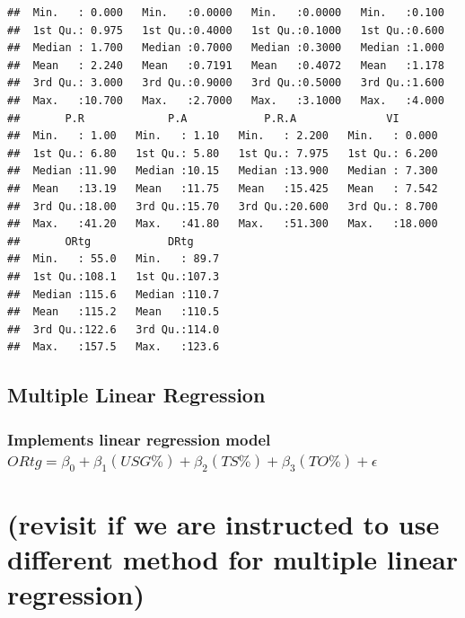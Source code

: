 \documentclass[
]{article}
\begin{document}
\begin{verbatim}
##  Min.   : 0.000   Min.   :0.0000   Min.   :0.0000   Min.   :0.100  
##  1st Qu.: 0.975   1st Qu.:0.4000   1st Qu.:0.1000   1st Qu.:0.600  
##  Median : 1.700   Median :0.7000   Median :0.3000   Median :1.000  
##  Mean   : 2.240   Mean   :0.7191   Mean   :0.4072   Mean   :1.178  
##  3rd Qu.: 3.000   3rd Qu.:0.9000   3rd Qu.:0.5000   3rd Qu.:1.600  
##  Max.   :10.700   Max.   :2.7000   Max.   :3.1000   Max.   :4.000  
##       P.R             P.A            P.R.A              VI        
##  Min.   : 1.00   Min.   : 1.10   Min.   : 2.200   Min.   : 0.000  
##  1st Qu.: 6.80   1st Qu.: 5.80   1st Qu.: 7.975   1st Qu.: 6.200  
##  Median :11.90   Median :10.15   Median :13.900   Median : 7.300  
##  Mean   :13.19   Mean   :11.75   Mean   :15.425   Mean   : 7.542  
##  3rd Qu.:18.00   3rd Qu.:15.70   3rd Qu.:20.600   3rd Qu.: 8.700  
##  Max.   :41.20   Max.   :41.80   Max.   :51.300   Max.   :18.000  
##       ORtg            DRtg      
##  Min.   : 55.0   Min.   : 89.7  
##  1st Qu.:108.1   1st Qu.:107.3  
##  Median :115.6   Median :110.7  
##  Mean   :115.2   Mean   :110.5  
##  3rd Qu.:122.6   3rd Qu.:114.0  
##  Max.   :157.5   Max.   :123.6
\end{verbatim}

\subsection{Multiple Linear
Regression}\label{multiple-linear-regression}

\subsubsection{\texorpdfstring{Implements linear regression model
\(ORtg = \beta_0 + \beta_1(USG\%) + \beta_2(TS\%) + \beta_3(TO\%) + \epsilon\)}{Implements linear regression model ORtg = \textbackslash beta\_0 + \textbackslash beta\_1(USG\textbackslash\%) + \textbackslash beta\_2(TS\textbackslash\%) + \textbackslash beta\_3(TO\textbackslash\%) + \textbackslash epsilon}}\label{implements-linear-regression-model-ortg-beta_0-beta_1usg-beta_2ts-beta_3to-epsilon}

\section{(revisit if we are instructed to use different method for
multiple linear
regression)}\label{revisit-if-we-are-instructed-to-use-different-method-for-multiple-linear-regression}
\end{document}
